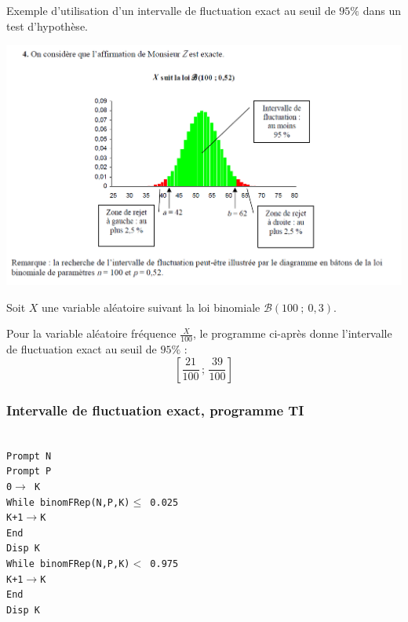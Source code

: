 \documentclass[xcolor=svgnames,t,final]{beamer}
\newcommand{\Interff}[2]{\left[#1\, ;\, #2\right]}
\newcommand{\loibinom}[2]{\mathcal{B}\left(#1\ ; \ #2 \right)}
\begin{document}
\begin{frame}

Exemple d'utilisation d'un intervalle de fluctuation exact au seuil de $95 \%$ dans un test d'hypothèse.

\begin{center}
\includegraphics[scale=0.25]{corrige_exemple_decision2.png}
\end{center}

\end{frame}


\begin{frame}

Soit $X$ une variable aléatoire suivant la loi binomiale $\loibinom{100}{0,3}$.

Pour la variable aléatoire fréquence $\frac{X}{100}$, le programme ci-après donne l'intervalle de fluctuation exact au seuil de $95 \%$ :
\begin{equation*}
\Interff{\frac{21}{100}}{\frac{39}{100}}
\end{equation*}

\end{frame}

\begin{frame}

\frametitle{Intervalle de fluctuation exact, programme TI}


\texttt{\\ 
Prompt N \\
Prompt P \\
0$\rightarrow$ K\\
While binomFRep(N,P,K)$\leqslant$ 0.025\\
K+1$\rightarrow$K\\
End\\
Disp K\\
While binomFRep(N,P,K)$<$ 0.975\\
K+1$\rightarrow$K\\
End\\
Disp K\\
}


\end{frame}
\end{document}
